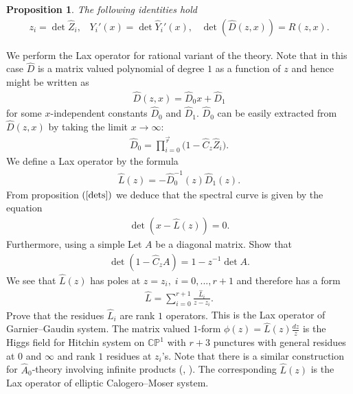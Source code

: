 \documentclass[12pt]{article}
\newtheorem{pr}{Proposition}[section]
\newcommand{\problemname}{}
\newenvironment{statement}[1]
 {\renewcommand{\problemname}{#1}\problem}
 {\endproblem}
\numberwithin{equation}{section}
\theoremstyle{definition}
\begin{document}
\begin{pr}\label{dets}
The following identities hold
\begin{align*}
z_{i} = \det \hat{Z}_{i}, \;\;\;
Y_{i}'(x) = \det \hat{Y}_{i}'(x), \;\;\;
\det(\hat{D}(z, x)) = R(z, x).
\end{align*}
\end{pr}
We perform the Lax operator for rational variant of the theory. Note that in this case $\hat{D}$ is a matrix valued polynomial of degree $1$ as a function of $z$ and hence might be written as
\begin{align*}
    \hat{D}(z, x) = \hat{D}_{0}x + \hat{D}_{1} 
\end{align*}
for some $x$-independent constants $\hat{D}_{0}$ and $\hat{D}_{1}$. $\hat{D}_{0}$ can be easily extracted from $\hat{D}(z, x)$ by taking the limit $x \rightarrow \infty$:
\begin{align*}
    \hat{D}_{0} = \prod\limits_{i = 0}^{\overset{\longrightarrow}{r}}\big( 1 - \hat{C}_{z} \hat{Z}_{i}\big).
\end{align*}
We define a Lax operator by the formula
\begin{align*}
    \hat{L}(z) = -\hat{D}_{0}^{-1}(z) \hat{D}_{1}(z).
\end{align*}
From proposition $(\ref{dets})$ we deduce that the spectral curve is given by the equation
\begin{align*}
    \det (x - \hat{L}(z)) = 0.
\end{align*}
Furthermore, using a simple
\begin{statement}{Problem 8}\normalfont \label{prob8}
 Let $A$ be a diagonal matrix. Show that
    \begin{align*}
        \det(1 - \hat{C}_{z}A) = 1 - z^{-1}\det A .
    \end{align*}
\end{statement}
We see that $\hat{L}(z)$ has poles at $z = z_{i},\; i = 0, ..., r+1$ and therefore has a form
\begin{align*}
    \hat{L} = \sum\limits_{i = 0}^{r+1}\frac{\hat{L}_{i}}{z - z_i }.
\end{align*}
\begin{statement}{Problem 9}\normalfont \label{prob9}
 Prove that the residues $\hat{L}_{i}$ are rank $1$ operators.
\end{statement}
This is the Lax operator of Garnier--Gaudin system. The matrix valued $1$-form $\phi(z) =  \hat{L}(z)\frac{d z}{z}$ is the Higgs field  for Hitchin system on $\mathbb{CP}^{1}$ with $r+3$ punctures with general residues at $0$ and $\infty$ and rank $1$ residues at $z_i$'s. Note that there is a similar construction for $\hat{A}_{0}$-theory involving infinite products (\cite{Grekov:2023fek}, \cite{Grekov:2024fyh}). The corresponding $\hat{L}(z)$ is the Lax operator of elliptic Calogero--Moser system. 
\end{document}
